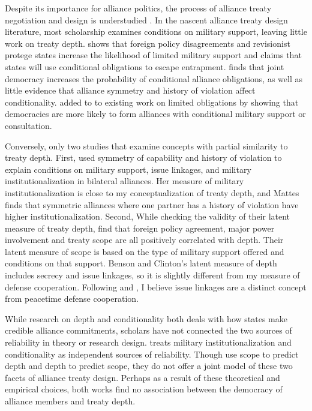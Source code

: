 \documentclass[12pt]{article}
\begin{document}
Despite its importance for alliance politics, the process of alliance treaty negotiation and design is understudied \citep{Poast2019a}. 
In the nascent alliance treaty design literature, most scholarship examines conditions on military support, leaving little work on treaty depth. 
\citet{Benson2012} shows that foreign policy disagreements and revisionist protege states increase the likelihood of limited military support and \citet{Kim2011} claims that states will use conditional obligations to escape entrapment. 
\citet{Mattes2012} finds that joint democracy increases the probability of conditional alliance obligations, as well as little evidence that alliance symmetry and history of violation affect conditionality. 
\citet{Chibaetal2015} added to to existing work on limited obligations by showing that democracies are more likely to form alliances with conditional military support or consultation. 


Conversely, only two studies that examine concepts with partial similarity to treaty depth. 
First, \citet{Mattes2012} used symmetry of capability and history of violation to explain conditions on military support, issue linkages, and military institutionalization in bilateral alliances. 
Her measure of military institutionalization \citep{LeedsAnac2005} is close to my conceptualization of treaty depth, and Mattes finds that symmetric alliances where one partner has a history of violation have higher institutionalization. 
Second, While checking the validity of their latent measure of treaty depth, \citet{BensonClinton2016} find that foreign policy agreement, major power involvement and treaty scope are all positively correlated with depth. 
Their latent measure of scope is based on the type of military support offered and conditions on that support. 
Benson and Clinton's latent measure of depth includes secrecy and issue linkages, so it is slightly different from my measure of defense cooperation. 
Following \citet{Mattes2012} and \citet{Poast2012}, I believe issue linkages are a distinct concept from peacetime defense cooperation.


While research on depth and conditionality both deals with how states make credible alliance commitments, scholars have not connected the two sources of reliability in theory or research design.  
\citet{Mattes2012} treats military institutionalization and conditionality as independent sources of reliability.
Though \citet{BensonClinton2016} use scope to predict depth and depth to predict scope, they do not offer a joint model of these two facets of alliance treaty design. 
Perhaps as a result of these theoretical and empirical choices, both works find no association between the democracy of alliance members and treaty depth. 
\end{document}
